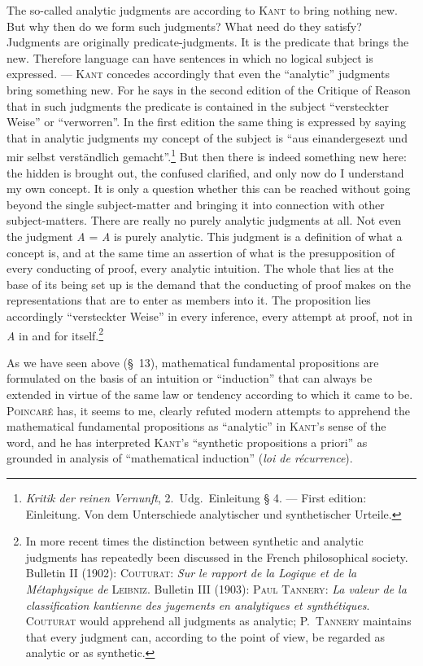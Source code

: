 \documentclass[12pt]{book}
\newcommand{\opage}[1]{\marginnote{\footnotesize\textit{[#1]}}}
\begin{document}
The so-called analytic judgments are according to \textsc{Kant} to bring nothing
new. But why then do we form such judgments? What need do they satisfy? Judgments
are originally predicate-judgments. It is the predicate that brings the new.
Therefore language can have sentences in which no logical subject is expressed.
--- \textsc{Kant} concedes accordingly that even the ``analytic'' judgments bring
something new. For he says in the second edition of the Critique of Reason that
in such judgments the predicate is contained in the subject ``versteckter \opage{41}Weise''
or ``verworren''. In the first edition the same thing is expressed by saying that
in analytic judgments my concept of the subject is ``aus einandergesezt und mir
selbst verständlich gemacht''.\footnote{\textit{Kritik der reinen Vernunft},
2.\ Udg.\ Einleitung § 4. --- First edition: Einleitung. Von dem Unterschiede
analytischer und synthetischer Urteile.} But then there is indeed something new
here: the hidden is brought out, the confused clarified, and only now do I
understand my own concept. It is only a question whether this can be reached
without going beyond the single subject-matter and bringing it into connection
with other subject-matters. There are really no purely analytic judgments at all.
Not even the judgment \textit{A} = \textit{A} is purely analytic. This judgment is
a definition of what a concept is, and at the same time an assertion of what is
the presupposition of every conducting of proof, every analytic intuition. The
whole that lies at the base of its being set up is the demand that the conducting
of proof makes on the representations that are to enter as members into it. The
proposition lies accordingly ``versteckter Weise'' in every inference, every
attempt at proof, not in \textit{A} in and for
itself.\footnote{In more recent times the distinction between synthetic and
analytic judgments has repeatedly been discussed in the French philosophical
society. Bulletin II (1902): \textsc{Couturat}: \textit{Sur le rapport de la
Logique et de la Métaphysique de} \textsc{Leibniz}. Bulletin III (1903):
\textsc{Paul Tannery}: \textit{La valeur de la classification kantienne des
jugements en analytiques et synthétiques}. \textsc{Couturat} would apprehend all
judgments as analytic; \textsc{P.\ Tannery} maintains that every judgment can,
according to the point of view, be regarded as analytic or as synthetic.}

As we have seen above (§~13), mathematical fundamental propositions are
formulated on the basis of an intuition or ``induction'' that can always be
extended in virtue of the same law or tendency according to which it came to be.
\textsc{Poincaré} has, it seems to me, clearly refuted modern attempts to
apprehend the mathematical fundamental propositions as ``analytic'' in
\textsc{Kant}'s sense of the word, and he has interpreted \textsc{Kant}'s
``synthetic propositions a priori'' as grounded in analysis of ``mathematical
induction'' (\textit{loi de récurrence}).
\end{document}
